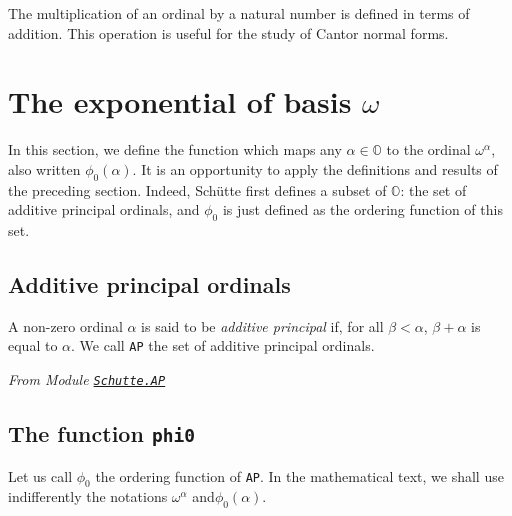 {The multiplication of an ordinal by a natural number is defined in terms of addition.
This operation is useful for the study of Cantor normal forms.



\section{The exponential of basis \texorpdfstring{$\omega$}{omega}}

In this section, we define the function which maps any $\alpha\in\mathbb{O}$ to
the ordinal  $\omega^\alpha$, also written 
$\phi_0(\alpha)$. 
It is an opportunity to apply the definitions and results of the preceding section. 
Indeed,  Schütte first defines a subset of $\mathbb{O}$: the set of additive principal ordinals, and $\phi_0$  is just defined as the ordering function of this set.

\subsection{Additive principal ordinals}


\begin{definition}
A non-zero ordinal  $\alpha$ is said to be \emph{additive principal} if, for all  $\beta<\alpha$, $\beta+\alpha$ is equal to  $\alpha$.
We call \texttt{AP} the set of additive principal ordinals.

\end{definition}



\noindent\emph{From Module \href{../theories/html/hydras.Schutte.AP.html}%
{\texttt{Schutte.AP}}}



\subsection{The function \texttt{phi0}}

Let us call  $\phi_0$ the ordering function of \texttt{AP}.
In the mathematical text, we shall use indifferently the notations  $\omega^\alpha$ and$\phi_0(\alpha)$. 





}
